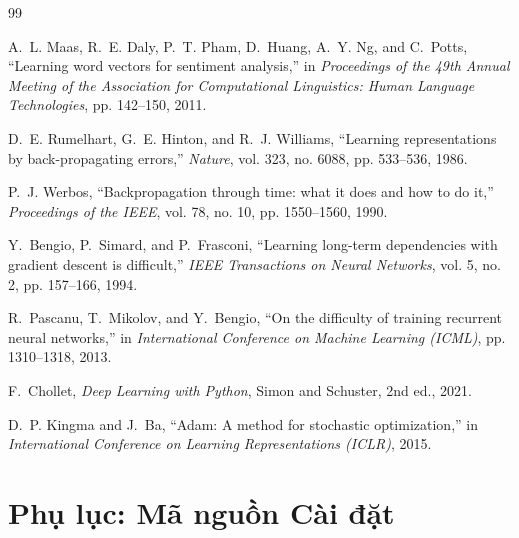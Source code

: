 \documentclass[11pt,a4paper]{article}
\begin{document}
\begin{thebibliography}{99}

A.~L. Maas, R.~E. Daly, P.~T. Pham, D.~Huang, A.~Y. Ng, and C.~Potts,
\newblock ``Learning word vectors for sentiment analysis,''
\newblock in \emph{Proceedings of the 49th Annual Meeting of the Association for Computational Linguistics: Human Language Technologies}, pp. 142--150, 2011.

D.~E. Rumelhart, G.~E. Hinton, and R.~J. Williams,
\newblock ``Learning representations by back-propagating errors,''
\newblock \emph{Nature}, vol. 323, no. 6088, pp. 533--536, 1986.

P.~J. Werbos,
\newblock ``Backpropagation through time: what it does and how to do it,''
\newblock \emph{Proceedings of the IEEE}, vol. 78, no. 10, pp. 1550--1560, 1990.

Y.~Bengio, P.~Simard, and P.~Frasconi,
\newblock ``Learning long-term dependencies with gradient descent is difficult,''
\newblock \emph{IEEE Transactions on Neural Networks}, vol. 5, no. 2, pp. 157--166, 1994.

R.~Pascanu, T.~Mikolov, and Y.~Bengio,
\newblock ``On the difficulty of training recurrent neural networks,''
\newblock in \emph{International Conference on Machine Learning (ICML)}, pp. 1310--1318, 2013.

F.~Chollet,
\newblock \emph{Deep Learning with Python},
\newblock Simon and Schuster, 2nd ed., 2021.

D.~P. Kingma and J.~Ba,
\newblock ``Adam: A method for stochastic optimization,''
\newblock in \emph{International Conference on Learning Representations (ICLR)}, 2015.

\end{thebibliography}

\newpage
\appendix
\section{Phụ lục: Mã nguồn Cài đặt}
\label{sec:appendix}
\end{document}
